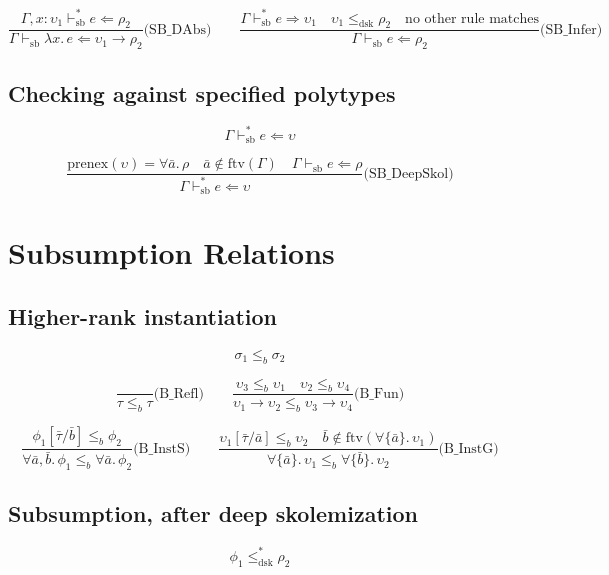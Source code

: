 \documentclass{article}
\begin{document}
\[
\frac{\Gamma, x\!:\!\upsilon_1 \vdash_{\mathrm{sb}}^{*} e \Leftarrow \rho_2}{\Gamma \vdash_{\mathrm{sb}} \lambda x.\, e \Leftarrow \upsilon_1 \to \rho_2}\text{(SB\_DAbs)}
\qquad
\frac{\Gamma \vdash_{\mathrm{sb}}^{*} e \Rightarrow \upsilon_1 \quad \upsilon_1 \leq_{\mathrm{dsk}} \rho_2 \quad \text{no other rule matches}}{\Gamma \vdash_{\mathrm{sb}} e \Leftarrow \rho_2}\text{(SB\_Infer)}
\]

\subsection*{Checking against specified polytypes}

\[
\boxed{\Gamma \vdash_{\mathrm{sb}}^{*} e \Leftarrow \upsilon}
\]

\[
\frac{\mathrm{prenex}(\upsilon) = \forall \bar{a}.\, \rho \quad \bar{a} \notin \mathrm{ftv}(\Gamma) \quad \Gamma \vdash_{\mathrm{sb}} e \Leftarrow \rho}{\Gamma \vdash_{\mathrm{sb}}^{*} e \Leftarrow \upsilon}\text{(SB\_DeepSkol)}
\]

\section*{Subsumption Relations}

\subsection*{Higher-rank instantiation}

\[
\boxed{\sigma_1 \leq_b \sigma_2}
\]

\[
\frac{}{\tau \leq_b \tau}\text{(B\_Refl)}
\qquad
\frac{\upsilon_3 \leq_b \upsilon_1 \quad \upsilon_2 \leq_b \upsilon_4}{\upsilon_1 \to \upsilon_2 \leq_b \upsilon_3 \to \upsilon_4}\text{(B\_Fun)}
\]

\[
\frac{\phi_1[\bar{\tau}/\bar{b}] \leq_b \phi_2}{\forall \bar{a}, \bar{b}.\, \phi_1 \leq_b \forall \bar{a}.\, \phi_2}\text{(B\_InstS)}
\qquad
\frac{\upsilon_1[\bar{\tau}/\bar{a}] \leq_b \upsilon_2 \quad \bar{b} \notin \mathrm{ftv}(\forall\{\bar{a}\}.\, \upsilon_1)}{\forall\{\bar{a}\}.\, \upsilon_1 \leq_b \forall\{\bar{b}\}.\, \upsilon_2}\text{(B\_InstG)}
\]

\subsection*{Subsumption, after deep skolemization}

\[
\boxed{\phi_1 \leq_{\mathrm{dsk}}^{*} \rho_2}
\]
\end{document}
